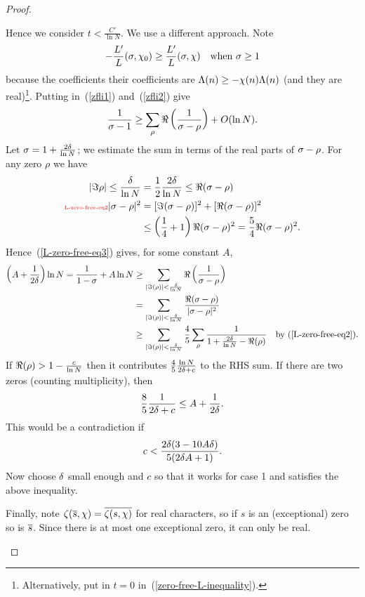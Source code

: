 \begin{proof}
\begin{enumerate}
Hence we consider $t<\frac{C'}{\ln N}$.
We use a different approach. Note
\[
-\frac{L'}{L}(\sigma,\chi_0)\ge \frac{L'}{L}(\sigma,\chi)\quad
\text{when }\sigma\ge 1
\]
because the coefficients their coefficients are $\Lambda(n)\ge -\chi(n)\Lambda(n)$ (and they are real)\footnote{Alternatively, put in $t=0$ in~(\ref{zero-free-L-inequality}).}. Putting in~(\ref{zfli1}) and~(\ref{zfli2}) give %
\begin{equation}
\label{L-zero-free-eq3}
\frac{1}{\sigma-1}\ge \sum_{\rho} \Re\left( {\frac{1}{\sigma-\rho}} \right)+O(\ln N).
\end{equation}
Let $\sigma=1+\frac{2\delta}{\ln N}$; we estimate the sum in terms of the real parts of $\sigma-\rho$. For any zero $\rho$ we have
\begin{align}
\nonumber
|\Im \rh|\le \frac{\de}{\ln N}&=\rc2\frac{2\de}{\ln N}\le \Re(\si-\rh)\\
\llabel{L-zero-free-eq2}
|\si-\rh|^2&=[\Im(\si-\rh)]^2+[\Re(\si-\rh)]^2\\
&\le \pa{\rc 4+1}\Re(\si-\rh)^2=\frac{5}{4}\Re(\si-\rh)^2.
\end{align}
Hence~(\ref{L-zero-free-eq3}) gives, for some constant $A$,
\begin{align*}
\pa{A+\rc{2\de}}\ln N=\rc{1-\si}+A\ln N
&\ge \sum_{|\Im(\rh)|<\frac{\de}{\ln N}} \Re\prc{\si-\rh}\\
&=\sum_{|\Im(\rh)|<\frac{\de}{\ln N}} \frac{\Re(\si-\rh)}{|\si-\rh|^2}\\
&\ge \sum_{|\Im(\rh)|<\frac{\de}{\ln N}} \frac{4}{5} \sum_{\rh}\rc{1+\fc{2\de}{\ln N}-\Re(\rh)}&\by{L-zero-free-eq2}.
\end{align*}
If $\Re(\rho)>1-\frac{c}{\ln N}$ then it contributes $\frac 45 \frac{\ln N}{2\delta+c}$ to the RHS sum. If there are two zeros (counting multiplicity), then %
\[
\frac{8}5 \frac{1}{2\delta+c} \le A+\frac{1}{2\delta}.
\]
This would be a contradiction if 
\[
c<\frac{2\delta(3-10A\delta)}{5(2\delta A+1)}.
\]
Now choose $\delta$ small enough and $c$ so that it works for case 1 and satisfies the above inequality.

Finally, note $\zeta(\overline{s},\chi)=\overline{\zeta(s,\chi)}$ for real characters, so if $s$ is an (exceptional) zero so is $\overline{s}$. Since there is at most one exceptional zero, it can only be real.\qedhere
\end{enumerate}
\end{proof}
